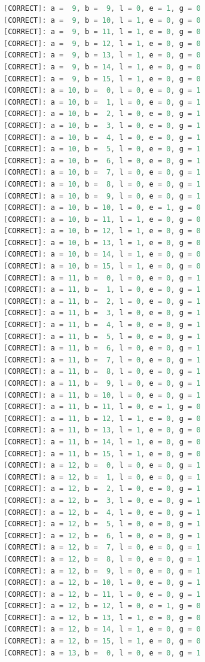 \documentclass[12pt,onecolumn]{article}
\begin{document}
\begin{lstlisting}[style=verilog, language=Verilog]
[CORRECT]: a =  9, b =  9, l = 0, e = 1, g = 0
[CORRECT]: a =  9, b = 10, l = 1, e = 0, g = 0
[CORRECT]: a =  9, b = 11, l = 1, e = 0, g = 0
[CORRECT]: a =  9, b = 12, l = 1, e = 0, g = 0
[CORRECT]: a =  9, b = 13, l = 1, e = 0, g = 0
[CORRECT]: a =  9, b = 14, l = 1, e = 0, g = 0
[CORRECT]: a =  9, b = 15, l = 1, e = 0, g = 0
[CORRECT]: a = 10, b =  0, l = 0, e = 0, g = 1
[CORRECT]: a = 10, b =  1, l = 0, e = 0, g = 1
[CORRECT]: a = 10, b =  2, l = 0, e = 0, g = 1
[CORRECT]: a = 10, b =  3, l = 0, e = 0, g = 1
[CORRECT]: a = 10, b =  4, l = 0, e = 0, g = 1
[CORRECT]: a = 10, b =  5, l = 0, e = 0, g = 1
[CORRECT]: a = 10, b =  6, l = 0, e = 0, g = 1
[CORRECT]: a = 10, b =  7, l = 0, e = 0, g = 1
[CORRECT]: a = 10, b =  8, l = 0, e = 0, g = 1
[CORRECT]: a = 10, b =  9, l = 0, e = 0, g = 1
[CORRECT]: a = 10, b = 10, l = 0, e = 1, g = 0
[CORRECT]: a = 10, b = 11, l = 1, e = 0, g = 0
[CORRECT]: a = 10, b = 12, l = 1, e = 0, g = 0
[CORRECT]: a = 10, b = 13, l = 1, e = 0, g = 0
[CORRECT]: a = 10, b = 14, l = 1, e = 0, g = 0
[CORRECT]: a = 10, b = 15, l = 1, e = 0, g = 0
[CORRECT]: a = 11, b =  0, l = 0, e = 0, g = 1
[CORRECT]: a = 11, b =  1, l = 0, e = 0, g = 1
[CORRECT]: a = 11, b =  2, l = 0, e = 0, g = 1
[CORRECT]: a = 11, b =  3, l = 0, e = 0, g = 1
[CORRECT]: a = 11, b =  4, l = 0, e = 0, g = 1
[CORRECT]: a = 11, b =  5, l = 0, e = 0, g = 1
[CORRECT]: a = 11, b =  6, l = 0, e = 0, g = 1
[CORRECT]: a = 11, b =  7, l = 0, e = 0, g = 1
[CORRECT]: a = 11, b =  8, l = 0, e = 0, g = 1
[CORRECT]: a = 11, b =  9, l = 0, e = 0, g = 1
[CORRECT]: a = 11, b = 10, l = 0, e = 0, g = 1
[CORRECT]: a = 11, b = 11, l = 0, e = 1, g = 0
[CORRECT]: a = 11, b = 12, l = 1, e = 0, g = 0
[CORRECT]: a = 11, b = 13, l = 1, e = 0, g = 0
[CORRECT]: a = 11, b = 14, l = 1, e = 0, g = 0
[CORRECT]: a = 11, b = 15, l = 1, e = 0, g = 0
[CORRECT]: a = 12, b =  0, l = 0, e = 0, g = 1
[CORRECT]: a = 12, b =  1, l = 0, e = 0, g = 1
[CORRECT]: a = 12, b =  2, l = 0, e = 0, g = 1
[CORRECT]: a = 12, b =  3, l = 0, e = 0, g = 1
[CORRECT]: a = 12, b =  4, l = 0, e = 0, g = 1
[CORRECT]: a = 12, b =  5, l = 0, e = 0, g = 1
[CORRECT]: a = 12, b =  6, l = 0, e = 0, g = 1
[CORRECT]: a = 12, b =  7, l = 0, e = 0, g = 1
[CORRECT]: a = 12, b =  8, l = 0, e = 0, g = 1
[CORRECT]: a = 12, b =  9, l = 0, e = 0, g = 1
[CORRECT]: a = 12, b = 10, l = 0, e = 0, g = 1
[CORRECT]: a = 12, b = 11, l = 0, e = 0, g = 1
[CORRECT]: a = 12, b = 12, l = 0, e = 1, g = 0
[CORRECT]: a = 12, b = 13, l = 1, e = 0, g = 0
[CORRECT]: a = 12, b = 14, l = 1, e = 0, g = 0
[CORRECT]: a = 12, b = 15, l = 1, e = 0, g = 0
[CORRECT]: a = 13, b =  0, l = 0, e = 0, g = 1

\end{lstlisting}
\end{document}
